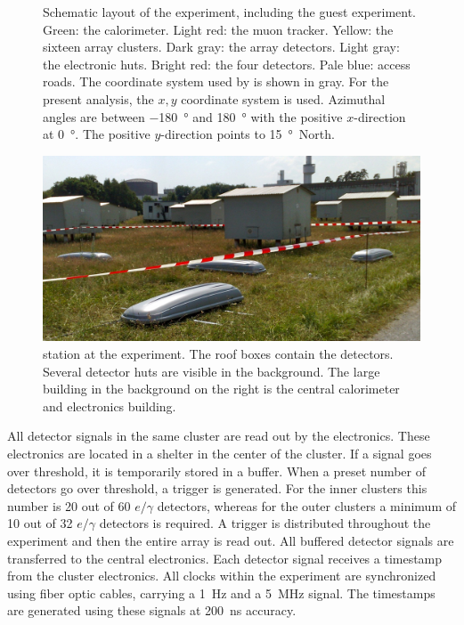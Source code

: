 \begin{figure}
\centering

\caption{Schematic layout of the \kascade experiment, including the \hisparc
guest experiment.  Green: the calorimeter.  Light red: the muon tracker.
Yellow: the sixteen array clusters.  Dark gray: the array detectors.  Light
gray: the electronic huts.  Bright red: the four \hisparc detectors.  Pale blue:
access roads.  The coordinate system used by \kascade is shown in gray.  For the
present analysis, the \kascade $x, y$ coordinate system is used.  Azimuthal
angles are between \SI{-180}{\degree} and \SI{180}{\degree} with the positive $x$-direction
at \SI{0}{\degree}.  The positive $y$-direction points to
\SI{15}{\degree}~North.}
\label{fig:map}
\end{figure}

\begin{figure}
\centering
\includegraphics[width=\linewidth]{figures/kascade}
\caption{\hisparc station at the \kascade experiment.  The roof boxes
contain the \hisparc detectors.  Several \kascade detector huts are
visible in the background.  The large building in the background on the
right is the central calorimeter and electronics building.}
\label{fig:kascade-station}
\end{figure}

All detector signals in the same cluster are read out by the \daq electronics.
These electronics are located in a shelter in the center of the cluster. If a
signal goes over threshold, it is temporarily stored in a buffer.
When a preset number of detectors go over threshold, a trigger is generated.
For the inner clusters this number is 20 out of 60 $e/\gamma$ detectors, whereas
for the outer clusters a minimum of 10 out of 32 $e/\gamma$ detectors is
required.  A trigger is distributed throughout the experiment and then the
entire array is read out.  All buffered detector signals are transferred to the
central electronics.  Each detector
signal receives a timestamp from the cluster electronics.  All clocks within the
experiment are synchronized using fiber optic cables, carrying a \SI{1}{\hertz}
and a \SI{5}{\mega\hertz} signal.
The timestamps are generated using these signals at \SI{200}{\nano\second}
accuracy.

